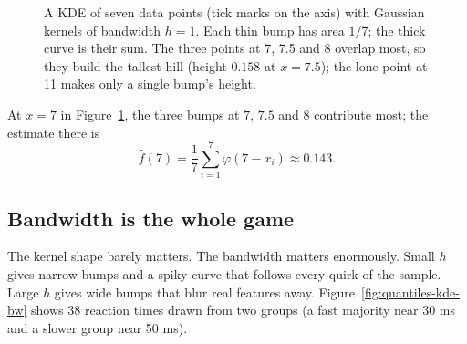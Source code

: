 \begin{figure}[H]
\centering
{}
\caption{A KDE of seven data points (tick marks on the axis) with Gaussian kernels of
bandwidth $h=1$. Each thin bump has area $1/7$; the thick curve is their sum. The three
points at 7, 7.5 and 8 overlap most, so they build the tallest hill (height $0.158$ at
$x=7.5$); the lone point at 11 makes only a single bump's height.}
\label{fig:quantiles-kde-build}
\end{figure}

At $x = 7$ in Figure~\ref{fig:quantiles-kde-build}, the three bumps at $7$, $7.5$ and $8$
contribute most; the estimate there is
\[
  \hat f(7) = \frac{1}{7} \sum_{i=1}^7 \varphi(7 - x_i) \approx 0.143 .
\]

\subsection{Bandwidth is the whole game}

The kernel shape barely matters. The bandwidth matters enormously. Small $h$ gives narrow
bumps and a spiky curve that follows every quirk of the sample. Large $h$ gives wide
bumps that blur real features away. Figure~\ref{fig:quantiles-kde-bw} shows 38
reaction times drawn from two groups (a fast majority near 30 ms and a slower group near
50 ms).

